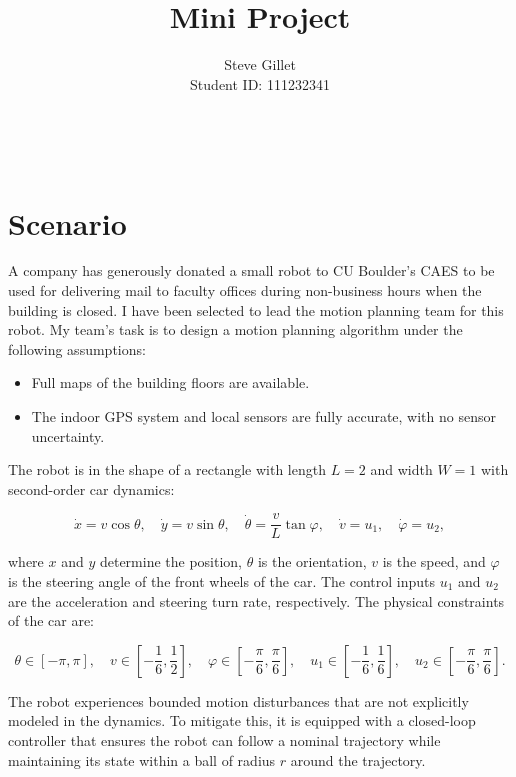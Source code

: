 \documentclass{article}
\title{Mini Project}
\author{Steve Gillet \\ Student ID: 111232341}
\date{\vspace{0.5cm}\className \\ \professorName \\ \taName}
\begin{document}
\begin{titlepage}
    \centering
    \maketitle
    \thispagestyle{empty}
\end{titlepage}

\newpage

\section{Scenario}

A company has generously donated a small robot to CU Boulder's CAES to be used for delivering mail to faculty offices during non-business hours when the building is closed. I have been selected to lead the motion planning team for this robot. My team’s task is to design a motion planning algorithm under the following assumptions:
\begin{itemize}
    \item Full maps of the building floors are available.
    \item The indoor GPS system and local sensors are fully accurate, with no sensor uncertainty.
\end{itemize}

The robot is in the shape of a rectangle with length \( L = 2 \) and width \( W = 1 \) with second-order car dynamics:

\[
\dot{x} = v \cos \theta, \quad \dot{y} = v \sin \theta, \quad \dot{\theta} = \frac{v}{L} \tan \varphi, \quad \dot{v} = u_1, \quad \dot{\varphi} = u_2,
\]

where \(x\) and \(y\) determine the position, \(\theta\) is the orientation, \(v\) is the speed, and \(\varphi\) is the steering angle of the front wheels of the car. The control inputs \(u_1\) and \(u_2\) are the acceleration and steering turn rate, respectively. The physical constraints of the car are:

\[
\theta \in [-\pi, \pi], \quad v \in \left[-\frac{1}{6}, \frac{1}{2}\right], \quad \varphi \in \left[-\frac{\pi}{6}, \frac{\pi}{6}\right], \quad u_1 \in \left[-\frac{1}{6}, \frac{1}{6}\right], \quad u_2 \in \left[-\frac{\pi}{6}, \frac{\pi}{6}\right].
\]

The robot experiences bounded motion disturbances that are not explicitly modeled in the dynamics. To mitigate this, it is equipped with a closed-loop controller that ensures the robot can follow a nominal trajectory while maintaining its state within a ball of radius \(r\) around the trajectory.
\end{document}
